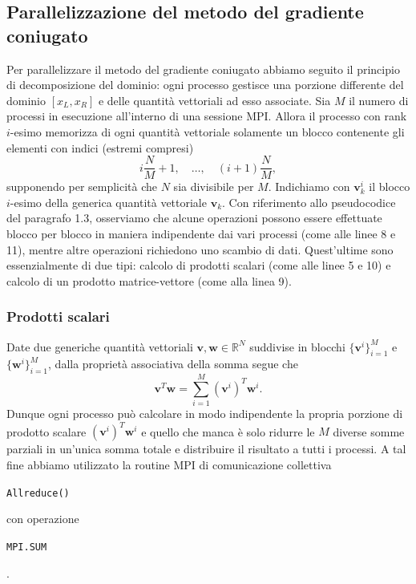 \documentclass[a4paper,11pt]{article}
\renewcommand{\vec}[1]{\bm{#1}}
\newcommand{\R}{\mathbb{R}}
\newcommand{\code}[1]{\begin{small}\texttt{#1}\end{small}}
\begin{document}
\subsection{Parallelizzazione del metodo del gradiente coniugato}
Per parallelizzare il metodo del gradiente coniugato
abbiamo seguito il principio di decomposizione del dominio:
ogni processo gestisce una porzione differente del dominio
$[x_L,x_R]$ e delle quantità vettoriali ad esso associate.
Sia $M$ il numero di processi in esecuzione
all'interno di una sessione MPI. Allora il processo
con rank $i$-esimo memorizza di ogni quantità vettoriale
solamente un blocco contenente gli elementi con indici
(estremi compresi)
\[
i \frac{N}{M} + 1, \quad \dots, \quad (i+1) \frac{N}{M},
\]
supponendo per semplicità che $N$ sia divisibile per $M$.
%
Indichiamo con $\vec{v}_k^i$ il blocco $i$-esimo della
generica quantità vettoriale $\vec{v}_k$.
Con riferimento allo pseudocodice del paragrafo 1.3,
osserviamo che alcune operazioni possono essere effettuate
blocco per blocco in maniera indipendente dai vari processi
(come alle linee 8 e 11),
mentre altre operazioni richiedono uno scambio di dati.
Quest'ultime sono essenzialmente di due tipi: calcolo di
prodotti scalari (come alle linee 5 e 10) e calcolo
di un prodotto matrice-vettore (come alla linea 9).

\subsubsection*{Prodotti scalari}
Date due generiche quantità vettoriali $\vec{v},\vec{w} \in \R^N$
suddivise in blocchi $\{\vec{v}^i\}_{i=1}^M$ e
$\{\vec{w}^i\}_{i=1}^M$, dalla proprietà associativa della somma
segue che
\[
\vec{v}^T \vec{w} = \sum_{i=1}^M (\vec{v}^i)^T \vec{w}^i.
\]
Dunque ogni processo può calcolare in modo indipendente
la propria porzione di prodotto scalare $(\vec{v}^i)^T \vec{w}^i$
e quello che manca è solo ridurre le $M$ diverse somme parziali
in un'unica somma totale e distribuire il risultato
a tutti i processi. A tal fine abbiamo utilizzato
la routine MPI di comunicazione collettiva \code{Allreduce()}
con operazione \code{MPI.SUM}.
\end{document}
